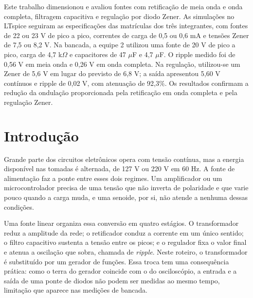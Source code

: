 \documentclass[11pt,a4paper]{article}
\begin{document}
\capa

\begin{resumo}
Este trabalho dimensionou e avaliou fontes com retificação de meia onda e onda completa, filtragem capacitiva e regulação por diodo Zener. As simulações no LTspice seguiram as especificações das matrículas dos três integrantes, com fontes de 22 ou 23 V de pico a pico, correntes de carga de 0,5 ou 0,6 mA e tensões Zener de 7,5 ou 8,2 V. Na bancada, a equipe 2 utilizou uma fonte de 20 V de pico a pico, carga de 4,7 k$\Omega$ e capacitores de 47 $\mu$F e 4,7 $\mu$F. O ripple medido foi de 0,56 V em meia onda e 0,26 V em onda completa. Na regulação, utilizou-se um Zener de 5,6 V em lugar do previsto de 6,8 V; a saída apresentou 5,60 V contínuos e ripple de 0,02 V, com atenuação de 92,3\%. Os resultados confirmam a redução da ondulação proporcionada pela retificação em onda completa e pela regulação Zener.
\end{resumo}

\section{Introdução}

Grande parte dos circuitos eletrônicos opera com tensão contínua, mas a energia disponível nas tomadas é alternada, de 127 V ou 220 V em 60 Hz. A fonte de alimentação faz a ponte entre esses dois regimes. Um amplificador ou um microcontrolador precisa de uma tensão que não inverta de polaridade e que varie pouco quando a carga muda, e uma senoide, por si, não atende a nenhuma dessas condições.

Uma fonte linear organiza essa conversão em quatro estágios. O transformador reduz a amplitude da rede; o retificador conduz a corrente em um único sentido; o filtro capacitivo sustenta a tensão entre os picos; e o regulador fixa o valor final e atenua a oscilação que sobra, chamada de \textit{ripple}. Neste roteiro, o transformador é substituído por um gerador de funções. Essa troca tem uma consequência prática: como o terra do gerador coincide com o do osciloscópio, a entrada e a saída de uma ponte de diodos não podem ser medidas ao mesmo tempo, limitação que aparece nas medições de bancada.
\end{document}
